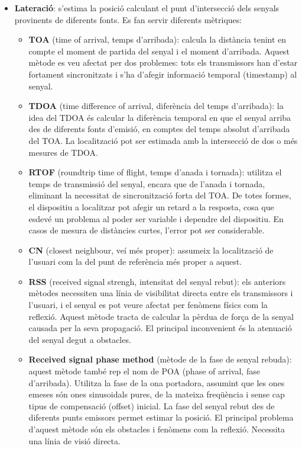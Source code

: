 \begin{itemize}

    \item \textbf{Lateració}: s'estima la posició calculant el punt d’intersecció dels senyals provinents de diferents fonts. Es fan servir diferents mètriques:

    \begin{itemize}
        \item \textbf{TOA} (time of arrival, temps d'arribada): calcula la distància tenint en compte el moment de partida del senyal i el moment d'arribada. Aquest mètode es veu afectat per dos problemes: tots els transmissors han d'estar fortament sincronitzats i s'ha d'afegir informació temporal (timestamp) al senyal.
        \item \textbf{TDOA} (time difference of arrival, diferència del temps d'arribada): la idea del TDOA és calcular la diferència temporal en que el senyal arriba des de diferents fonts d’emisió, en comptes del temps absolut d'arribada del TOA. La localització pot ser estimada amb la intersecció de dos o més mesures de TDOA.
        \item \textbf{RTOF} (roundtrip time of flight, temps d'anada i tornada): utilitza el temps de transmissió del senyal, encara que de l'anada i tornada, eliminant la necessitat de sincronització forta del TOA. De totes formes, el dispositiu a localitzar pot afegir un retard a la resposta, cosa que esdevé un problema al poder ser variable i dependre del dispositiu. En casos de mesura de distàncies curtes, l'error pot ser considerable.
        \item \textbf{CN} (closest neighbour, veí més proper): assumeix la localització de l’usuari com la del punt de referència més proper a aquest.
        \item \textbf{RSS} (received signal strengh, intensitat del senyal rebut): els anteriors mètodes necessiten una línia de visibilitat directa entre els transmissors i l'usuari, i el senyal es pot veure afectat per fenòmens físics com la reflexió. Aquest mètode tracta de calcular la pèrdua de força de la senyal causada per la seva propagació. El principal inconvenient és la atenuació del senyal degut a obstacles.
        \item \textbf{Received signal phase method} (mètode de la fase de senyal rebuda): aquest mètode també rep el nom de POA (phase of arrival, fase d'arribada). Utilitza la fase de la ona portadora, assumint que les ones emeses són ones sinusoidals pures, de la mateixa freqüència i sense cap tipus de compensació (offset) inicial. La fase del senyal rebut des de diferents punts emissors permet estimar la posició. El principal problema d'aquest mètode són els obstacles i fenòmens com la reflexió. Necessita una línia de visió directa.


\end{itemize}
\end{itemize}
